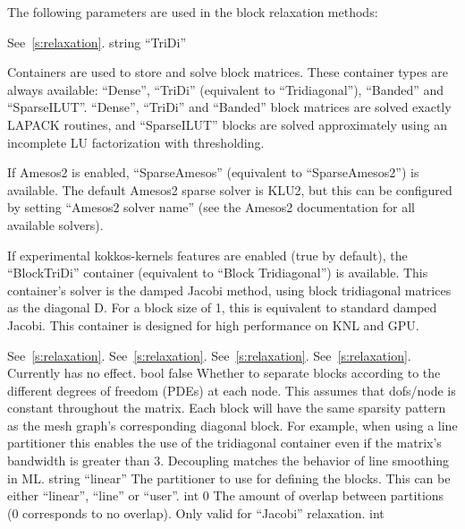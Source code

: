 The following parameters are used in the block relaxation methods:

    {See~\ref{s:relaxation}.}
    {string}
    {``TriDi''}
    {Containers are used to store and solve block matrices. These container
     types are always available: ``Dense'', ``TriDi''
     (equivalent to ``Tridiagonal''), ``Banded'' and ``SparseILUT''.
     ``Dense'', ``TriDi'' and ``Banded'' block matrices are
     solved exactly LAPACK routines, and ``SparseILUT'' blocks are solved approximately
     using an incomplete LU factorization with thresholding.

     If Amesos2 is enabled, ``SparseAmesos'' (equivalent to ``SparseAmesos2'') is available.
     The default Amesos2 sparse solver is KLU2, but this can be configured by setting
     ``Amesos2 solver name'' (see the Amesos2 documentation for all available solvers).

     If experimental kokkos-kernels features are enabled (true by default), the ``BlockTriDi''
     container (equivalent to ``Block Tridiagonal'') is available. This container's solver is the damped Jacobi method, using
     block tridiagonal matrices as the diagonal D.
     For a block size of 1, this is equivalent to standard damped Jacobi.
     This container is designed for high performance on KNL and GPU.}
    {See~\ref{s:relaxation}.}
    {See~\ref{s:relaxation}.}
    {See~\ref{s:relaxation}.}
    {See~\ref{s:relaxation}. Currently has no effect. }
    {bool}
    {false}
    {Whether to separate blocks according to the different degrees of
     freedom (PDEs) at each node. This assumes that dofs/node is constant
     throughout the matrix. Each block will have the same sparsity
     pattern as the mesh graph's corresponding diagonal block.
     For example, when using a line partitioner this
     enables the use of the tridiagonal container even if the matrix's
     bandwidth is greater than 3.
     Decoupling matches the behavior of line smoothing in ML.}
    {string}
    {``linear''}
    {The partitioner to use for defining the blocks.  This can be either
     ``linear'', ``line'' or ``user''.}
    {int}
    {0}
    {The amount of overlap between partitions (0 corresponds to no overlap).
     Only valid for ``Jacobi'' relaxation.}
    {int}
